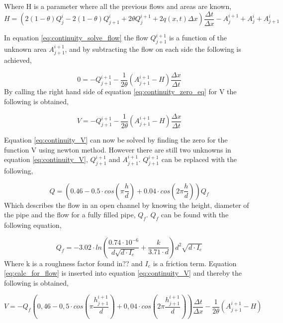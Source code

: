 Where H is a parameter where all the previous flows and areas are known,
\begin{equation}
	H = \left(2(1-\theta)Q_j^i-2(1-\theta)Q_{j+1}^i+2\theta Q_j^{i+1}+2q(x,t)\Delta x\right)\frac{\Delta t}{\Delta x}- A_{j}^{i+1}+A_j^i+A_{j+1}^i
\end{equation}


In equation \ref{eq:continuity_solve_flow} the flow $Q_{j+1}^{i+1}$ is a function of the unknown area $A_{j+1}^{i+1}$, and by subtracting the flow on each side the following is achieved, 

\begin{equation}\label{eq:continuity_zero_eq}
		0=-Q_{j+1}^{i+1}  - \frac{1}{2\theta}\left(A_{j+1}^{i+1}-H\right)\frac{\Delta x}{\Delta t}
\end{equation}
By calling the right hand side of equation \ref{eq:continuity_zero_eq} for V the following is obtained,

\begin{equation}\label{eq:continuity_V}
		V=-Q_{j+1}^{i+1}  - \frac{1}{2\theta}\left(A_{j+1}^{i+1}-H\right)\frac{\Delta x}{\Delta t}
\end{equation}

Equation \ref{eq:continuity_V} can now be solved by finding the zero for the function V using newton method. However there are still two unknowns in equation \ref{eq:continuity_V}, $Q_{j+1}^{i+1}$ and $A_{j+1}^{i+1}$. $Q_{j+1}^{i+1}$ can be replaced with the following, 

\begin{equation}\label{eq:calc_for_flow}
 	Q = \left(0.46-0.5 \cdot cos\left(\pi \frac{h}{d}\right)+0.04\cdot cos\left(2\pi\frac{h}{d}\right)\right)Q_f
\end{equation}
Which describes the flow in an open channel by knowing the height, diameter of the pipe and the flow for a fully filled pipe, $Q_f$. $Q_f$ can be found with the following equation, 

\begin{equation}\label{eq:qf_for_flow}
	Q_f = -3.02 \cdot ln\left(\frac{0.74\cdot 10^{-6}}{d\sqrt{d\cdot I_e}}+\frac{k}{3.71\cdot d}\right)d^2\sqrt{d\cdot I_e}
\end{equation}
Where k is a roughness factor found in??  and $I_e$ is a friction term. Equation \ref{eq:calc_for_flow} is inserted into equation \ref{eq:continuity_V} and thereby the following is obtained,

\begin{equation}\label{eq:V_with_flow}
	V = -Q_f\left(0,46-0,5\cdot cos\left(\pi \frac{h_{j+1}^{i+1}}{d}\right)+0,04\cdot cos\left(2\pi\frac{h_{j+1}^{i+1}}{d}\right)\right)\frac{\Delta t}{\Delta x}-\frac{1}{2\theta}\left(A_{j+1}^{i+1}-H\right)
\end{equation}

